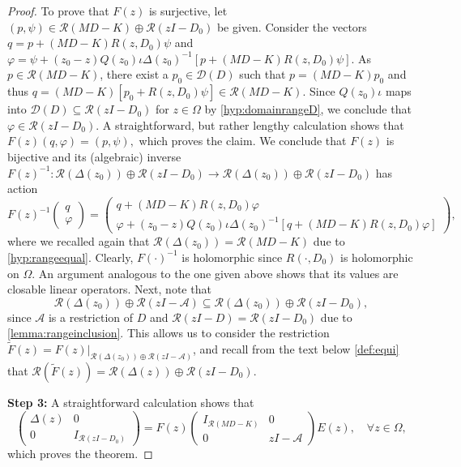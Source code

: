 \documentclass[english]{myarticle}
\begin{document}
\begin{sloppypar}
\begin{proof}
To prove that $F(z)$ is surjective, let $(p,\psi) \in \mathcal{R}(MD-K) \oplus \mathcal{R}(zI-D_0)$ be given. Consider the vectors $q = p + (MD-K)R(z,D_0)\psi$ and $\varphi = \psi + (z_0-z)Q(z_0)\iota\Delta(z_0)^{-1}[p + (MD-K)R(z,D_0)\psi]$. As $p \in \mathcal{R}(MD-K)$, there exist a $p_0 \in \mathcal{D}(D)$ such that $p = (MD-K)p_0$ and thus $q = (MD-K)[p_0 + R(z,D_0)\psi] \in \mathcal{R}(MD-K)$. Since $Q(z_0)\iota$ maps into $\mathcal{D}(D) \subseteq \mathcal{R}(zI-D_0)$ for $z \in \Omega$ by \ref{hyp:domainrangeD}, we conclude that $\varphi \in \mathcal{R}(zI-D_0)$. A straightforward, but rather lengthy calculation shows that $F(z)(q,\varphi) = (p,\psi),$ which proves the claim. We conclude that $F(z)$ is bijective and its (algebraic) inverse $F(z)^{-1} : \mathcal{R}(\Delta(z_0)) \oplus \mathcal{R}(zI-D_0) \to \mathcal{R}(\Delta(z_0)) \oplus \mathcal{R}(zI-D_0)$ has action
\begin{equation} \label{eq:F(z)inv}
    F(z)^{-1} 
    \begin{pmatrix}
        q \\
        \varphi
    \end{pmatrix}
    =
    \begin{pmatrix}
        q + (MD-K)R(z,D_0)\varphi \\
        \varphi + (z_0-z)Q(z_0)\iota\Delta(z_0)^{-1}[q + (MD-K)R(z,D_0)\varphi]
    \end{pmatrix},
\end{equation}
where we recalled again that $\mathcal{R}(\Delta(z_0)) = \mathcal{R}(MD-K)$ due to \ref{hyp:rangeequal}. Clearly, $F(\cdot)^{-1}$ is holomorphic since $R(\cdot,D_0)$ is holomorphic on $\Omega$. An argument analogous to the one given above shows that its values are closable linear operators. Next, note that
\begin{equation*}
    \mathcal{R}(\Delta(z_0)) \oplus \mathcal{R}(zI-\mathcal{A})\subseteq \mathcal{R}(\Delta(z_0)) \oplus \mathcal{R}(zI-D_0),
\end{equation*}
since $\mathcal{A}$ is a restriction of $D$ and $\mathcal{R}(zI-D) = \mathcal{R}(zI-D_0)$ due to \cref{lemma:rangeinclusion}. This allows us to consider the restriction $\tilde{F}(z) = F(z)|_{\mathcal{R}(\Delta(z_0)) \oplus \mathcal{R}(zI-\mathcal{A})}$, and recall from the text below \cref{def:equi} that $\mathcal{R}(\tilde{F}(z)) = \mathcal{R}(\Delta(z)) \oplus \mathcal{R}(zI-D_0)$. 

\textbf{Step 3:} A straightforward calculation shows that
\begin{equation*}
    \begin{pmatrix}
        \Delta(z) & 0 \\
        0 & I_{\mathcal{R}(zI - D_0)}
    \end{pmatrix}
    =
    F(z)
    \begin{pmatrix}
        I_{\mathcal{R}(MD-K)}& 0 \\
        0 & zI - \mathcal{A}
    \end{pmatrix}
    E(z), \quad \forall z \in \Omega,
\end{equation*}
which proves the theorem.
\end{proof}


\end{sloppypar}
\end{document}
